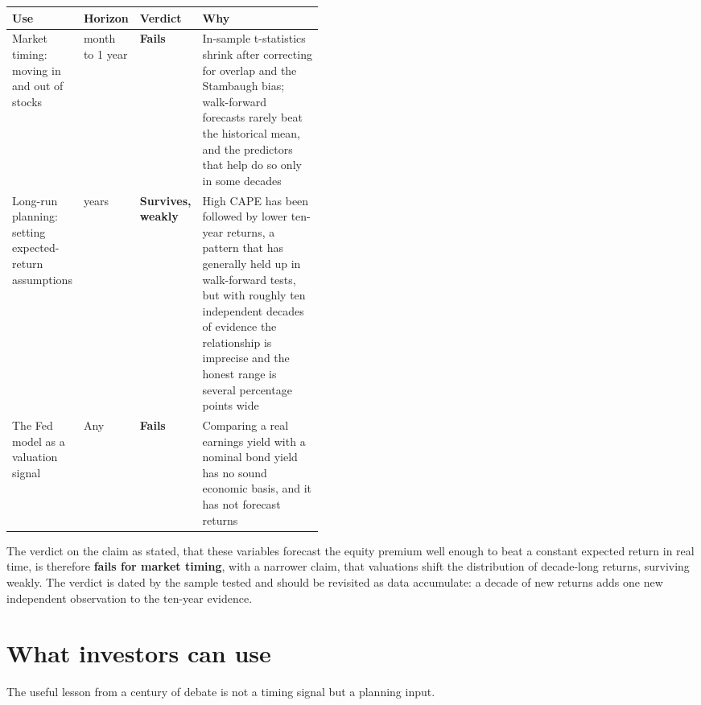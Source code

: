 \begin{center}
\small
\begin{tabularx}{0.9\linewidth}{@{}>{\raggedright\arraybackslash}p{0.21\linewidth}>{\raggedright\arraybackslash}p{0.11\linewidth}>{\raggedright\arraybackslash}p{0.13\linewidth}>{\raggedright\arraybackslash}X@{}}
\toprule
Use & Horizon & Verdict & Why \\
\midrule
Market timing: moving in and out of stocks & 1 month to 1 year & \textbf{Fails} & In-sample t-statistics shrink after correcting for overlap and the Stambaugh bias; walk-forward forecasts rarely beat the historical mean, and the predictors that help do so only in some decades \\
Long-run planning: setting expected-return assumptions & 10 years & \textbf{Survives, weakly} & High CAPE has been followed by lower ten-year returns, a pattern that has generally held up in walk-forward tests, but with roughly ten independent decades of evidence the relationship is imprecise and the honest range is several percentage points wide \\
The Fed model as a valuation signal & Any & \textbf{Fails} & Comparing a real earnings yield with a nominal bond yield has no sound economic basis, and it has not forecast returns \\
\bottomrule
\end{tabularx}
\end{center}

The verdict on the claim as stated, that these variables forecast the equity premium well enough to beat a constant expected return in real time, is therefore \textbf{fails for market timing}, with a narrower claim, that valuations shift the distribution of decade-long returns, surviving weakly. The verdict is dated by the sample tested and should be revisited as data accumulate: a decade of new returns adds one new independent observation to the ten-year evidence.

\section{What investors can use}
\label{sec:07-investors}

The useful lesson from a century of debate is not a timing signal but a planning input.

